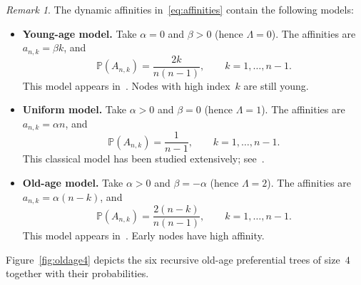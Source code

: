 \documentclass[11pt]{article}
\theoremstyle{remark}
\newtheorem{remark}{Remark}
\newcommand{\Pbb}{\mathbb{P}}
\begin{document}
\begin{remark}
The dynamic affinities in~\eqref{eq:affinities} contain the following models:
\begin{itemize}
\item \textbf{Young-age model.} Take \(\alpha=0\) and \(\beta>0\) (hence
\(\Lambda=0\)). The affinities are \(a_{n,k}=\beta k\), and
\[
\Pbb(A_{n,k})=\frac{2k}{n(n-1)},\qquad k=1,\ldots,n-1.
\]
This model appears in~\citep{lyon2020,lyon2022}. Nodes with high index~$k$ are
still young.
\item \textbf{Uniform model.} Take \(\alpha>0\) and \(\beta=0\) (hence
\(\Lambda=1\)). The affinities are \(a_{n,k}=\alpha n\), and
\[
\Pbb(A_{n,k})=\frac{1}{n-1},\qquad k=1,\ldots,n-1.
\]
This classical model has been studied extensively;
see~\citep{drmota2009,frieze2016,smythe1995}.
\item \textbf{Old-age model.} Take \(\alpha>0\) and \(\beta=-\alpha\) (hence
\(\Lambda=2\)). The affinities are \(a_{n,k}=\alpha(n-k)\), and
\[
\Pbb(A_{n,k})=\frac{2(n-k)}{n(n-1)},\qquad k=1,\ldots,n-1.
\]
This model appears in~\citep{hofri2018}. Early nodes have high affinity.
\end{itemize}
\end{remark}

Figure~\ref{fig:oldage4} depicts the six recursive old-age preferential trees of
size~$4$ together with their probabilities.
\end{document}
